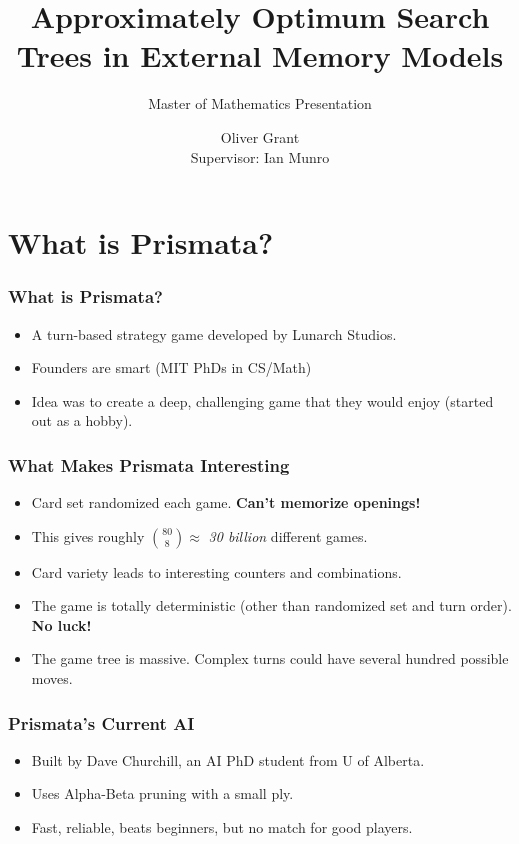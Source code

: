 \documentclass[]{beamer}
\title{Approximately Optimum Search
Trees in External Memory Models}
\subtitle{Master of Mathematics Presentation}
\author{Oliver Grant \\
Supervisor: Ian Munro}
\begin{document}
 \date{}
\begin{frame}
  \titlepage
\end{frame}


\section{What is Prismata?}

\begin{frame}
\frametitle{What is Prismata?}

  \begin{itemize}
   \item A turn-based strategy game developed by Lunarch Studios.
   \item Founders are smart (MIT PhDs in CS/Math)
   \item Idea was to create a deep, challenging game that they would enjoy (started out as a hobby).
  \end{itemize}
  
\end{frame}


\begin{frame}
\frametitle{What Makes Prismata Interesting}
  \begin{itemize}
   \item Card set randomized each game. \textbf{Can't memorize openings!}
   \item This gives roughly ${80 \choose 8} \approx$ \textit{30 billion} different games.
   \item Card variety leads to interesting counters and combinations.
   \item The game is totally deterministic (other than randomized set and turn order). \textbf{No luck!}
   \item The game tree is massive. Complex turns could have several hundred possible moves.
  	
  \end{itemize}
  
\end{frame}


\begin{frame}
\frametitle{Prismata's Current AI}
\begin{center}
\cite{dave}
\end{center}
  \begin{itemize}
   \item Built by Dave Churchill, an AI PhD student from U of Alberta.
   \item Uses Alpha-Beta pruning with a small ply.
   \item Fast, reliable, beats beginners, but no match for good players. 	
  \end{itemize}
  
\end{frame}
\end{document}
